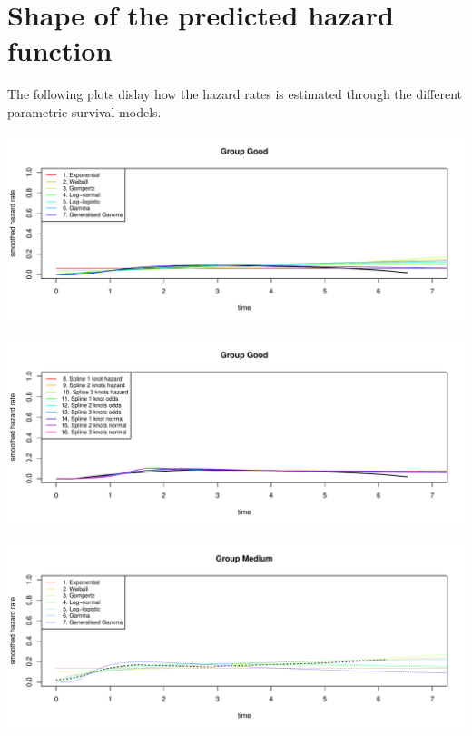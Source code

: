 \documentclass[
]{article}
\begin{document}
\newpage

\hypertarget{shape-of-the-predicted-hazard-function}{%
\section{Shape of the predicted hazard
function}\label{shape-of-the-predicted-hazard-function}}

The following plots dislay how the hazard rates is estimated through the
different parametric survival models.

\begin{flushleft}\includegraphics[height=0.29\textheight]{Images/plot_haz_pred-1} \end{flushleft}

\begin{flushleft}\includegraphics[height=0.29\textheight]{Images/plot_haz_pred-2} \end{flushleft}

\begin{flushleft}\includegraphics[height=0.29\textheight]{Images/plot_haz_pred-3} \end{flushleft}
\end{document}
